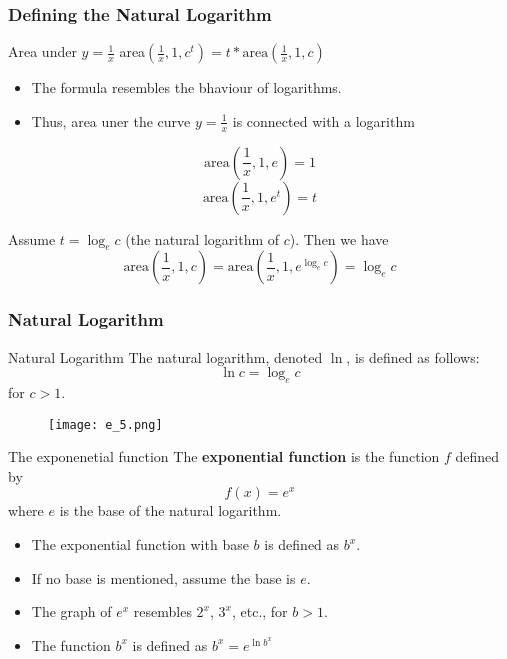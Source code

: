 \begin{frame}
  \frametitle{Defining the Natural Logarithm}
  \begin{block}{Area under \(y = \frac{1}{x}\)}
      area\((\frac{1}{x},1,c^{t}) = t*\text{area}(\frac{1}{x},1,c) \)
  \end{block}
  \begin{itemize}
    \item The formula resembles the bhaviour of logarithms.
    \item Thus, area uner the curve \(y = \frac{1}{x}\) is connected with a logarithm
  \end{itemize}
  \[\text{area}(\frac{1}{x},1,e) = 1 \]
\[\text{area}(\frac{1}{x},1,e^{t}) = t \]

Assume \(t = \log_e c\) (the natural logarithm of \(c\)). Then we have
\[\text{area}(\frac{1}{x},1,c) = \text{area}(\frac{1}{x},1,e^{\log_e c}) = \log_e c\]  
\end{frame}


\begin{frame}
  \frametitle{Natural Logarithm}
  
      \begin{block}{Natural Logarithm}
        The natural logarithm, denoted \(\ln\), is defined as follows:
        \[
          \ln c = \log_e c
        \]
        for \(c > 1\).
      \end{block}
      \begin{figure}
        \centering
        \texttt{[image: e\_5.png]}
      \end{figure}
\end{frame}

\begin{frame}
  \begin{block}{The exponenetial function}
    The \textbf{exponential function} is the function \(f\) defined by 
    \[ f(x) = e^{x} \]
    where \(e\) is the base of the natural logarithm.
  \end{block}
        \begin{itemize}
            \item The exponential function with base \( b \) is defined as \( b^x \).
            \item If no base is mentioned, assume the base is \( e \).
            \item The graph of \( e^x \) resembles \( 2^x \), \( 3^x \), etc., for \( b > 1 \).
            \item The function \(b^{x}\) is defined as \( b^{x} = e^{\ln b^{x}} \)
        \end{itemize}
\end{frame}

